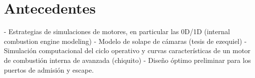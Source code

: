 \chapter{Antecedentes}

- Estrategias de simulaciones de motores, en particular las 0D/1D (internal combustion engine modeling)
- Modelo de solape de cámaras (tesis de ezequiel)
- Simulación computacional del ciclo operativo y curvas características de un motor de combustión interna de avanzada (chiquito)
- Diseño óptimo preliminar para los puertos de admisión y escape.
